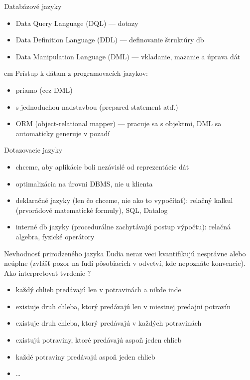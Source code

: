 \documentclass[12pt]{beamer}
\begin{document}
\begin{frame}{Databázové jazyky}
\begin{itemize}
\item Data Query Language (DQL) --- dotazy
\item Data Definition Language (DDL) --- definovanie štruktúry db
\item Data Manipulation Language (DML) --- vkladanie, mazanie a úprava dát
\end{itemize}
 cm
\pause
Prístup k dátam z programovacích jazykov:
\begin{itemize}
\item priamo (cez DML)
\item s jednoduchou nadstavbou (prepared statement atď.)
\item ORM (object-relational mapper) --- pracuje sa s objektmi, DML sa automaticky generuje v pozadí 
\end{itemize}
\end{frame}

\begin{frame}{Dotazovacie jazyky}
\begin{itemize}
\item chceme, aby aplikácie boli nezávislé od reprezentácie dát
\item optimalizácia na úrovni DBMS, nie u klienta
\pause
\item deklaračné jazyky (len čo chceme, nie ako to vypočítať): relačný kalkul (prvorádové matematické formuly), SQL, Datalog
\pause
\item interné db jazyky (procedurálne zachytávajú postup výpočtu): relačná algebra, fyzické operátory
\end{itemize}
\end{frame}

\begin{frame}{Nevhodnosť prirodzeného jazyka}
Ľudia neraz veci kvantifikujú nesprávne alebo neúplne (zvlášť pozor na ľudí pôsobiacich v odvetví, kde nepoznáte konvencie).
Ako interpretovať tvrdenie ?
\pause
\begin{itemize}
\item každý chlieb predávajú len v potravinách a nikde inde
\item existuje druh chleba, ktorý predávajú len v miestnej predajni potravín
\item existuje druh chleba, ktorý predávajú v každých potravinách
\item existujú potraviny, ktoré predávajú aspoň jeden chlieb
\item každé potraviny predávajú aspoň jeden chlieb
\item \dots
\end{itemize}
\end{frame}
\end{document}
